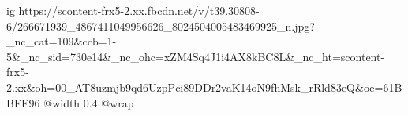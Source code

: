  
 
 
 
 

\ifcmt
  ig https://scontent-frx5-2.xx.fbcdn.net/v/t39.30808-6/266671939_4867411049956626_8024504005483469925_n.jpg?_nc_cat=109&ccb=1-5&_nc_sid=730e14&_nc_ohc=xZM4Sq4J1i4AX8kBC8L&_nc_ht=scontent-frx5-2.xx&oh=00_AT8uzmjb9qd6UzpPci89DDr2vaK14oN9fhMsk_rRld83eQ&oe=61BBFE96
  @width 0.4
  @wrap 
\fi
